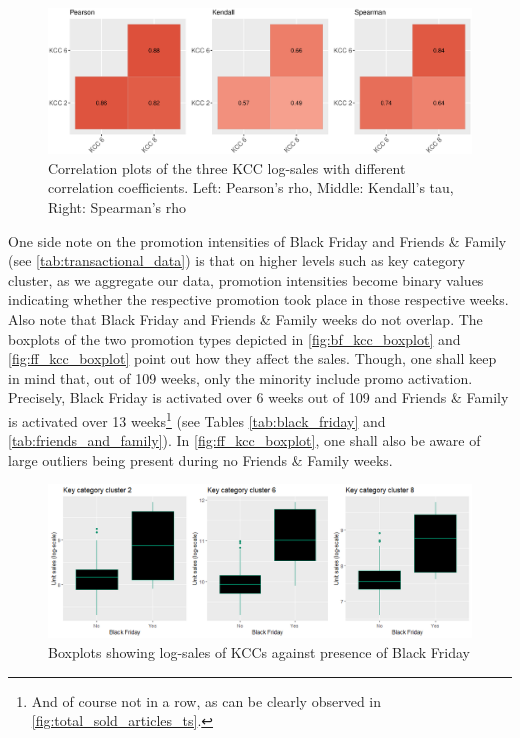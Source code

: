 \begin{figure}[H]
\centering
  \includegraphics[width=0.95\linewidth]{figures/corplot_kcc.eps}
  \caption{Correlation plots of the three \ac{KCC} log-sales with different correlation coefficients. Left: Pearson's rho, Middle: Kendall's tau, Right: Spearman's rho}
  \label{fig:corplot_kcc}
\end{figure}




One side note on the promotion intensities of Black Friday and Friends \& Family (see \autoref{tab:transactional_data}) is that on higher levels such as key category cluster, as we aggregate our data, promotion intensities become binary values indicating whether the respective promotion took place in those respective weeks. Also note that Black Friday and Friends \& Family weeks do not overlap. The boxplots of the two promotion types depicted in \autoref{fig:bf_kcc_boxplot} and \autoref{fig:ff_kcc_boxplot} point out how they affect the sales. Though, one shall keep in mind that, out of 109 weeks, only the minority include promo activation. Precisely, Black Friday is activated over 6 weeks out of 109 and Friends \& Family is activated over 13 weeks\footnote{And of course not in a row, as can be clearly observed in \autoref{fig:total_sold_articles_ts}.} (see Tables \ref{tab:black_friday} and \ref{tab:friends_and_family}). In \autoref{fig:ff_kcc_boxplot}, one shall also be aware of large outliers being present during no Friends \& Family weeks.
\\


\begin{figure}[H]
\centering
  \includegraphics[width=0.95\linewidth]{figures/bf_kcc_boxplot.png}
  \caption{Boxplots showing log-sales of KCCs against presence of Black Friday}
  \label{fig:bf_kcc_boxplot}
\end{figure}


